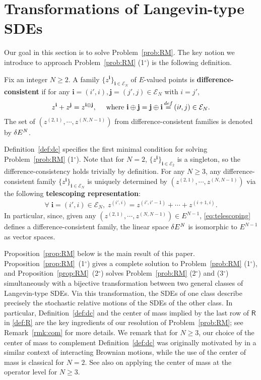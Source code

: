 \documentclass[12pt, twoside]{article}
\numberwithin{figure}{section}
\newcommand{\1}{\mathds 1}
\newcommand{\mc}{\mathcal}
\newcommand{\2}{{\mathbf 1}}
\newcommand{\defeq}{{\stackrel{\rm def}{=}}}
\newcommand{\cc}{{^\circ}}
\newcommand{\bi}{\mathbf i}
\newcommand{\bj}{\mathbf j}
\newcommand{\CN}{E^{\it N}}
\begin{document}
\section{Transformations of Langevin-type SDEs}
Our goal in this section is to solve Problem~\ref{prob:RM}. The key notion we introduce to approach Problem~\ref{prob:RM} (1$\cc$) is the following definition. 

\begin{defi}\label{def:dc}
Fix an integer $N\geq 2$. A family $\{z^\bi\}_{\bi\in \mathcal E_N}$ of $E$-valued points is {\bf difference-consistent} if for any $\bi=(i\prime,i),\bj=(j\prime,j)\in \mathcal E_N$ with $i=j\prime$, 
\begin{align}\label{defeq:dc}
z^\bi+z^\bj=z^{\bi\oplus \bj},\quad \mbox{ where }\bi\oplus \bj=\bj\oplus \bi\,\defeq\,(i\prime,j)\in \mathcal E_N.
\end{align}
The set of $(z^{(2,1)},\cdots,z^{(N,N-1)})$ from
 difference-consistent families is denoted by $\delta \CN$.
\end{defi}

Definition~\ref{def:dc} specifies the first minimal condition for solving Problem~\ref{prob:RM} (1$\cc$).
Note that for $N=2$, $\{z^\bi\}_{\bi\in \mc E_2}$ is a singleton, so the difference-consistency holds trivially by definition. For any $N\geq 3$, 
any difference-consistent family $\{z^\bi\}_{\bi\in \mathcal E_N}$ is uniquely determined by $(z^{(2,1)},\cdots,z^{(N,N-1)})$ via the following {\bf telescoping representation}: 
\begin{align}\label{eq:telescoping}
\forall\;\bi=(i\prime,i)\in \mathcal E_N, \; z^{(i\prime,i)}=z^{(i\prime,i\prime-1)}+\cdots +z^{(i+1,i)}. 
\end{align}
In particular, since, given any $(z^{(2,1)},\cdots,z^{(N,N-1)})\in E^{N-1}$, \eqref{eq:telescoping} defines a difference-consistent family, the linear space $\delta \CN$ is isomorphic to $E^{N-1}$ as vector spaces.  

Proposition~\ref{prop:RM} below is the main result of this paper. Proposition~\ref{prop:RM}~(1$\cc$) gives a complete solution to Problem~\ref{prob:RM} (1$\cc$), and Proposition~\ref{prop:RM}~(2$\cc$) solves Problem~\ref{prob:RM} (2$\cc$) and (3$\cc$) simultaneously with a bijective transformation between two general classes of Langevin-type SDEs. Via this transformation, the SDEs of one class describe precisely the stochastic relative motions of the SDEs of the other class. In particular, Definition~\ref{def:dc} and the center of mass implied by the last row of $\mathsf R$ in \eqref{def:R} are the key ingredients of our resolution of Problem~\ref{prob:RM}; see Remark~\ref{rmk:com} for more details. We remark that for $N\geq 3$, our choice of the center of mass to complement Definition~\ref{def:dc} was originally motivated by \cite{SP:08-4} in a similar context of interacting Brownian motions, while the use of the center of mass is classical for $N=2$. See also \cite{GH:Short-4} on applying the center of mass at the operator level for $N\geq 3$. 
\end{document}
